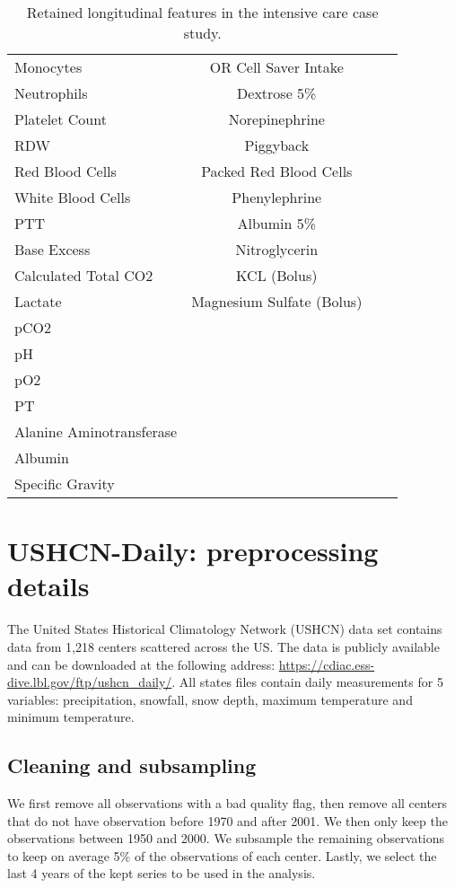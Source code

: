 \documentclass{article}
\begin{document}
\begin{table}[htbp]
\begin{adjustbox}{width=\textwidth}
\begin{tabular}{| l | c | c | r | }
       Monocytes & OR Cell Saver Intake & & \\
       Neutrophils & Dextrose 5\% & & \\
       Platelet Count & Norepinephrine & & \\
       RDW & Piggyback & & \\
       Red Blood Cells & Packed Red Blood Cells & & \\
       White Blood Cells & Phenylephrine & & \\
       PTT & Albumin 5\% & & \\
       Base Excess & Nitroglycerin & & \\
       Calculated Total CO2 & KCL (Bolus) & & \\
       Lactate & Magnesium Sulfate (Bolus) & & \\
       pCO2 & & & \\
       pH & & & \\
       pO2 & & & \\
       PT & & & \\
       Alanine Aminotransferase & & & \\
       Albumin & & & \\
       Specific Gravity & & & \\
      \bottomrule
   \end{tabular}
   \end{adjustbox}
    \caption{Retained longitudinal features in the intensive care case study.}
   \label{tab:MIMIC-feats}
\end{table}

\section{USHCN-Daily: preprocessing details}
\label{app:ushcn}

The United States Historical Climatology Network (USHCN) data set contains data from 1,218 centers scattered across the US. The data is publicly available and can be downloaded at the following address: \url{https://cdiac.ess-dive.lbl.gov/ftp/ushcn_daily/}. All states files contain daily measurements for 5 variables: precipitation, snowfall, snow depth, maximum temperature and minimum temperature. 

\subsection{Cleaning and subsampling}

We first remove all observations with a bad quality flag, then remove all centers that do not have observation before 1970 and after 2001. We then only keep the observations between 1950 and 2000. We subsample the remaining observations to keep on average 5\% of the observations of each center. Lastly, we select the last 4 years of the kept series to be used in the analysis.
\end{document}
